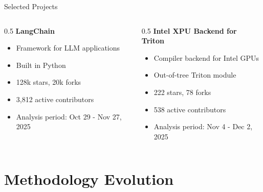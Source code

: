 \documentclass[aspectratio=169]{beamer}
\begin{document}
\begin{frame}{Selected Projects}
  \begin{columns}
    \begin{column}{0.5\textwidth}
      \textbf{LangChain}
      \begin{itemize}
        \item Framework for LLM applications
        \item Built in Python
        \item 128k stars, 20k forks
        \item 3,812 active contributors
        \item Analysis period: Oct 29 - Nov 27, 2025
      \end{itemize}
    \end{column}

    \begin{column}{0.5\textwidth}
      \textbf{Intel XPU Backend for Triton}
      \begin{itemize}
        \item Compiler backend for Intel GPUs
        \item Out-of-tree Triton module
        \item 222 stars, 78 forks
        \item 538 active contributors
        \item Analysis period: Nov 4 - Dec 2, 2025
      \end{itemize}
    \end{column}
  \end{columns}
\end{frame}

\section{Methodology Evolution}
\end{document}
